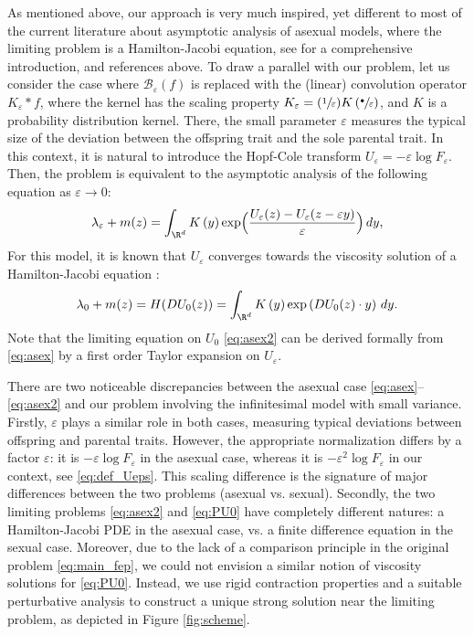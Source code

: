 \documentclass[JEP,XML,SOM,Unicode]{cedram}
\let\mathcal\mathscr
\newcommand{\sbullet}{{\scriptscriptstyle\bullet}}
\newcommand{\csbullet}{{\raisebox{1pt}{$\sbullet$}}}
\newcommand{\Psfrac}[2]{(\sfrac{#1}{#2})}
\newcommand{\cB}{\mathcal{B}}
\theoremstyle{plain}
\theoremstyle{definition}
\let\eps\varepsilon
\begin{document}
As mentioned above,
our approach is very much inspired, yet different to most of the current literature about asymptotic analysis of asexual models, where the limiting problem is a Hamilton-Jacobi equation, see \cite{perthame-book} for a comprehensive introduction, and references above. To draw a parallel with our problem, let us consider the case where $\cB_\eps(f)$ is replaced with the (linear) convolution operator $ K_\eps*f$, where the kernel has the scaling property $ K_\eps = \Psfrac1\eps K\left (\sfrac{\csbullet}{\eps}\right)$, and $K$ is a probability distribution kernel. There, the small parameter $\eps$ measures the typical size of the deviation between the offspring trait and the sole parental trait. In this context, it is natural to introduce the Hopf-Cole transform $U_\eps = - \eps \log F_\eps$. Then, the problem is equivalent to the asymptotic analysis of the following equation as $\eps\to0$:
\begin{equation}\label{eq:asex}
\lambda_\eps + m(z) = \int_{\R^d} K\left(y\right) \exp\Bigl(\dfrac{U_\eps(z)-U_\eps(z-\eps y)}\eps \Bigr)\, dy,
\end{equation}
For this model, it is known that $U_\eps$ converges towards the viscosity solution of a Hamilton-Jacobi equation \cite{mirrahimiconcentration}:
\begin{equation}\label{eq:asex2}
\lambda_0 + m(z) = H(D U_0(z)) = \int_{\R^d} K\left(y\right) \exp\left(D U_0(z)\cdot y \right)\, dy.
\end{equation}
Note that the limiting equation on $U_0$ \eqref{eq:asex2} can be derived formally from \eqref{eq:asex} by a first order Taylor expansion on $U_\eps$.

There are two noticeable discrepancies between the asexual case \eqref{eq:asex}--\eqref{eq:asex2} and our problem involving the infinitesimal model with small variance. Firstly, $\eps$ plays a similar role in both cases, \ie measuring typical deviations between offspring and parental traits. However, the appropriate normalization differs by a factor $\eps$: it is $-\eps \log F_\eps$ in the asexual case, whereas it is $-\eps^2 \log F_\eps$ in our context, see \eqref{eq:def_Ueps}. This scaling difference is the signature of major differences between the two problems (asexual vs. sexual). Secondly, the two limiting problems \eqref{eq:asex2} and \eqref{eq:PU0} have completely different natures: a Hamilton-Jacobi PDE in the asexual case, vs. a finite difference equation in the sexual case. Moreover, due to the lack of a comparison principle in the original problem \eqref{eq:main_fep}, we could not envision a similar notion of viscosity solutions for \eqref{eq:PU0}. Instead, we use rigid contraction properties and a
suitable perturbative analysis to construct a unique strong solution near the limiting problem, as depicted in Figure \ref{fig:scheme}.
\end{document}

